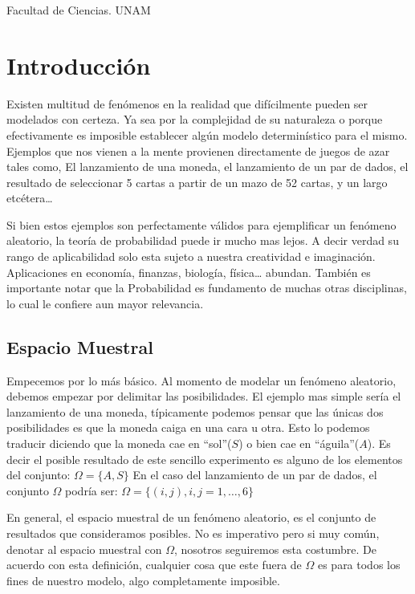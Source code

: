 \documentclass[14pt]{extreport}
\newcounter{ejemplo}[chapter] %
\begin{document}
Facultad de Ciencias. UNAM

\chapter{Introducción}

Existen multitud de fenómenos en la realidad que difícilmente pueden ser modelados con certeza. Ya sea por la complejidad de su naturaleza o
porque efectivamente es imposible establecer algún modelo determinístico para el mismo. Ejemplos que nos vienen a la mente provienen directamente
de juegos de azar tales como, El lanzamiento de una moneda, el lanzamiento de un par de dados, el resultado de seleccionar 5 cartas a partir de un mazo de 52 cartas, y un largo etcétera\ldots{}

Si bien estos ejemplos son perfectamente válidos para ejemplificar un fenómeno aleatorio, la teoría de probabilidad puede ir mucho mas lejos. A decir verdad su rango de aplicabilidad solo esta sujeto a nuestra creatividad e imaginación. Aplicaciones en economía, finanzas, biología, física\dots{} abundan. También es importante notar que la Probabilidad es fundamento de muchas otras disciplinas, lo cual le confiere aun mayor relevancia.


\section{Espacio Muestral}

Empecemos por lo más básico. Al momento de modelar un fenómeno aleatorio, debemos empezar por delimitar las posibilidades. El ejemplo mas simple sería el lanzamiento de una moneda, típicamente podemos pensar que las únicas dos posibilidades es que la moneda caiga en una cara u otra. Esto lo podemos traducir diciendo que la moneda cae en ``sol''($S$) o bien cae en ``águila''($A$). Es decir el posible resultado de este sencillo experimento es alguno de los elementos del conjunto: $\Omega = \{A, S\}$ En el caso del lanzamiento de un par de dados, el conjunto $\Omega$ podría ser: $\Omega = \{(i , j), i , j = 1,\ldots , 6\}$

En general, el espacio muestral de un fenómeno aleatorio, es el conjunto de resultados que consideramos posibles. No es imperativo pero si muy común, denotar al espacio muestral con $\Omega$, nosotros seguiremos esta costumbre. De acuerdo con esta definición, cualquier cosa que este fuera de $\Omega$ es para todos los fines de nuestro modelo, algo completamente imposible.
\end{document}
